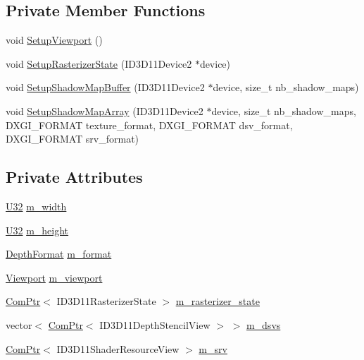 \subsection*{Private Member Functions}
\begin{DoxyCompactItemize}
\item 
void \hyperlink{structmage_1_1_shadow_map_buffer_aacabad92fb9c0bf81cf2f3c1fbae9f13}{Setup\+Viewport} ()
\item 
void \hyperlink{structmage_1_1_shadow_map_buffer_ab36561e9927e59c99100777875f6ce3b}{Setup\+Rasterizer\+State} (I\+D3\+D11\+Device2 $\ast$device)
\item 
void \hyperlink{structmage_1_1_shadow_map_buffer_a359a1174cfa0e95e8988a16343f47643}{Setup\+Shadow\+Map\+Buffer} (I\+D3\+D11\+Device2 $\ast$device, size\+\_\+t nb\+\_\+shadow\+\_\+maps)
\item 
void \hyperlink{structmage_1_1_shadow_map_buffer_a6bafee84f640806c85352f77847f55ef}{Setup\+Shadow\+Map\+Array} (I\+D3\+D11\+Device2 $\ast$device, size\+\_\+t nb\+\_\+shadow\+\_\+maps, D\+X\+G\+I\+\_\+\+F\+O\+R\+M\+AT texture\+\_\+format, D\+X\+G\+I\+\_\+\+F\+O\+R\+M\+AT dsv\+\_\+format, D\+X\+G\+I\+\_\+\+F\+O\+R\+M\+AT srv\+\_\+format)
\end{DoxyCompactItemize}
\subsection*{Private Attributes}
\begin{DoxyCompactItemize}
\item 
\hyperlink{namespacemage_a41c104c036fba3756a74e19f793eeaa1}{U32} \hyperlink{structmage_1_1_shadow_map_buffer_ac8c9e5e52c31c9d358e4bb0f306439a6}{m\+\_\+width}
\item 
\hyperlink{namespacemage_a41c104c036fba3756a74e19f793eeaa1}{U32} \hyperlink{structmage_1_1_shadow_map_buffer_a4e4048bd48e7cd347729f1a675a73ed3}{m\+\_\+height}
\item 
\hyperlink{namespacemage_aed4c3f883a30484d0a20762c06be81d4}{Depth\+Format} \hyperlink{structmage_1_1_shadow_map_buffer_a84ec323bfc88313547f21051b2b70637}{m\+\_\+format}
\item 
\hyperlink{classmage_1_1_viewport}{Viewport} \hyperlink{structmage_1_1_shadow_map_buffer_a5dd4126af774f674f69280f53dd8393d}{m\+\_\+viewport}
\item 
\hyperlink{namespacemage_ae74f374780900893caa5555d1031fd79}{Com\+Ptr}$<$ I\+D3\+D11\+Rasterizer\+State $>$ \hyperlink{structmage_1_1_shadow_map_buffer_a46cf9e88e20431629f6622e3647fd58b}{m\+\_\+rasterizer\+\_\+state}
\item 
vector$<$ \hyperlink{namespacemage_ae74f374780900893caa5555d1031fd79}{Com\+Ptr}$<$ I\+D3\+D11\+Depth\+Stencil\+View $>$ $>$ \hyperlink{structmage_1_1_shadow_map_buffer_acea16328aa086a093ad3f2ef54eb5f4a}{m\+\_\+dsvs}
\item 
\hyperlink{namespacemage_ae74f374780900893caa5555d1031fd79}{Com\+Ptr}$<$ I\+D3\+D11\+Shader\+Resource\+View $>$ \hyperlink{structmage_1_1_shadow_map_buffer_af313b37ddc41f91e949d015086f6ba18}{m\+\_\+srv}
\end{DoxyCompactItemize}


